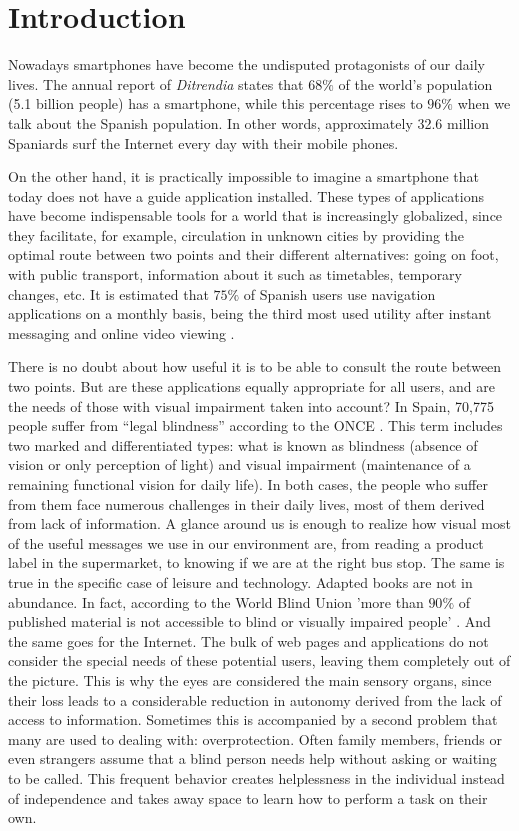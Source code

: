 \chapter{Introduction}
\label{cap:introduction}

Nowadays smartphones have become the undisputed protagonists of our daily lives. The annual report of \textit{Ditrendia} \citep{ditrendia2019informe} states that $68\%$ of the world's population (5.1 billion people) has a smartphone, while this percentage rises to $96\%$ when we talk about the Spanish population. In other words, approximately 32.6 million Spaniards surf the Internet every day with their mobile phones. 

On the other hand, it is practically impossible to imagine a smartphone that today does not have a guide application installed. These types of applications have become indispensable tools for a world that is increasingly globalized, since they facilitate, for example, circulation in unknown cities by providing the optimal route between two points and their different alternatives: going on foot, with public transport, information about it such as timetables, temporary changes, etc. It is estimated that $75\%$ of Spanish users use navigation applications on a monthly basis, being the third most used utility after instant messaging and online video viewing \citep{ditrendia2019informe}.

There is no doubt about how useful it is to be able to consult the route between two points. But are these applications equally appropriate for all users, and are the needs of those with visual impairment taken into account? In Spain, 70,775 people suffer from ``legal blindness'' according to the ONCE \citep{informeceguera}. This term includes two marked and differentiated types: what is known as blindness (absence of vision or only perception of light) and visual impairment (maintenance of a remaining functional vision for daily life). In both cases, the people who suffer from them face numerous challenges in their daily lives, most of them derived from lack of information. A glance around us is enough to realize how visual most of the useful messages we use in our environment are, from reading a product label in the supermarket, to knowing if we are at the right bus stop. The same is true in the specific case of leisure and technology. Adapted books are not in abundance. In fact, according to the World Blind Union 'more than $90\%$ of published material is not accessible to blind or visually impaired people' \citep{envision}. And the same goes for the Internet. The bulk of web pages and applications do not consider the special needs of these potential users, leaving them completely out of the picture. This is why the eyes are considered the main sensory organs, since their loss leads to a considerable reduction in autonomy derived from the lack of access to information. Sometimes this is accompanied by a second problem that many are used to dealing with: overprotection. Often family members, friends or even strangers assume that a blind person needs help without asking or waiting to be called. This frequent behavior creates helplessness in the individual instead of independence and takes away space to learn how to perform a task on their own. 


